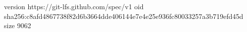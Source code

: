 version https://git-lfs.github.com/spec/v1
oid sha256:c8afd4867738f82d6b3664dde406144e7e4e25e936fc80033257a3b719efd45d
size 9062
